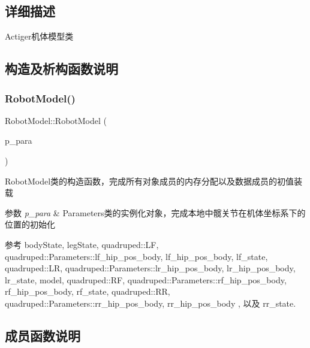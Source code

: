 \subsection{详细描述}
Actiger机体模型类 

\subsection{构造及析构函数说明}
\mbox{\label{classquadruped_1_1RobotModel_a2b085b7aa05e3eee3762ce41f7071c49}} 
\subsubsection{\texorpdfstring{Robot\+Model()}{RobotModel()}}
{\footnotesize\ttfamily Robot\+Model\+::\+Robot\+Model (\begin{DoxyParamCaption}\item[{\hyperlink{classquadruped_1_1Parameters}{Parameters} $\ast$}]{p\+\_\+para }\end{DoxyParamCaption})\hspace{0.3cm}{\ttfamily [explicit]}}



Robot\+Model类的构造函数，完成所有对象成员的内存分配以及数据成员的初值装载 


\begin{DoxyParams}{参数}
{\em p\+\_\+para} & Parameters类的实例化对象，完成本地中髋关节在机体坐标系下的位置的初始化 \\
\hline
\end{DoxyParams}


参考 body\+State, leg\+State, quadruped\+::\+LF, quadruped\+::\+Parameters\+::lf\+\_\+hip\+\_\+pos\+\_\+body, lf\+\_\+hip\+\_\+pos\+\_\+body, lf\+\_\+state, quadruped\+::\+LR, quadruped\+::\+Parameters\+::lr\+\_\+hip\+\_\+pos\+\_\+body, lr\+\_\+hip\+\_\+pos\+\_\+body, lr\+\_\+state, model, quadruped\+::\+RF, quadruped\+::\+Parameters\+::rf\+\_\+hip\+\_\+pos\+\_\+body, rf\+\_\+hip\+\_\+pos\+\_\+body, rf\+\_\+state, quadruped\+::\+RR, quadruped\+::\+Parameters\+::rr\+\_\+hip\+\_\+pos\+\_\+body, rr\+\_\+hip\+\_\+pos\+\_\+body , 以及 rr\+\_\+state.



\subsection{成员函数说明}
\mbox{\label{classquadruped_1_1RobotModel_ab012ef79f233734f3598493711c8fb4c}} 
